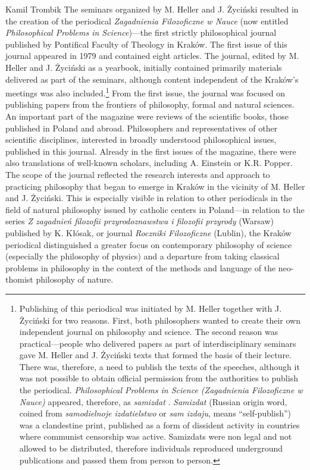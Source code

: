 \begin{artengenv}{Kamil Trombik}
The seminars organized by M. Heller and J. Życiński resulted in the creation of the periodical \textit{Zagadnienia
Filozoficzne w Nauce} (now entitled \textit{Philosophical Problems in Science})---the first strictly
philosophical journal published by Pontifical Faculty of Theology in Kraków. The first issue of this journal appeared
in 1979 and contained eight articles. The journal, edited by M. Heller and J. Życiński as a yearbook, initially
contained primarily materials delivered as part of the seminars, although content independent of the
Kraków's meetings was also included.\footnote{Publishing of this periodical was initiated by M. Heller together with J. Życiński for two
reasons. First, both philosophers wanted to create their own independent journal on philosophy and science. The second
reason was practical---people who delivered papers as part of interdisciplinary seminars gave M. Heller and J. Życiński
texts that formed the basis of their lecture. There was, therefore, a need to publish the texts of the speeches,
although it was not possible to obtain official permission from the authorities to publish the periodical.
\textit{Philosophical Problems in Science (Zagadnienia Filozoficzne w Nauce)} appeared, therefore, as \textit{samizdat}
\parencite{heller_interview_2017}.
\textit{Samizdat} (Russian origin word, coined from \textit{samodielnoje
izdatielstwo} or \textit{sam izdaju}, means ``self-publish'') was a clandestine print, published as a form of dissident
activity in countries where communist censorship was active. Samizdats were non legal and not allowed to be
distributed, therefore individuals reproduced underground publications and passed them from person to person. } From
the first issue, the journal was focused on publishing papers from the frontiers of philosophy, formal and natural
sciences. An important part of the magazine were reviews of the scientific books, those published in Poland and abroad.
Philosophers and representatives of other scientific disciplines, interested in broadly understood philosophical
issues, published in this journal. Already in the first issues of the magazine, there were also translations of
well-known scholars, including A. Einstein or K.R. Popper. The scope of the journal reflected the research interests
and approach to practicing philosophy that began to emerge in Kraków in the vicinity of M. Heller and J. Życiński. This
is especially visible in relation to other periodicals in the field of natural philosophy issued by catholic centers in
Poland---in relation to the series \textit{Z zagadnień filozofii przyrodoznawstwa i filozofii przyrody} (Warsaw)
published by K. Kłósak, or journal \textit{Roczniki Filozoficzne }(Lublin), the Kraków periodical distinguished a
greater focus on contemporary philosophy of science (especially the philosophy of physics) and a departure from taking
classical problems in philosophy in the context of the methods and language of the neo-thomist philosophy of nature.


\end{artengenv}
